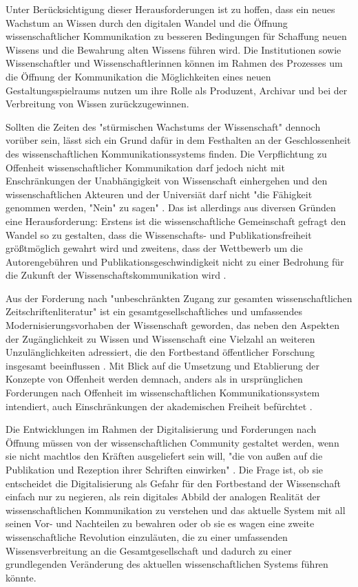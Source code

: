 Unter Berücksichtigung dieser Herausforderungen ist zu hoffen, dass ein neues Wachstum an Wissen durch den digitalen Wandel und die Öffnung wissenschaftlicher Kommunikation zu besseren Bedingungen für Schaffung neuen Wissens und die Bewahrung alten Wissens führen wird. Die Institutionen sowie Wissenschaftler und Wissenschaftlerinnen können im Rahmen des Prozesses um die Öffnung der Kommunikation die Möglichkeiten eines neuen Gestaltungsspielraums nutzen um ihre Rolle als Produzent, Archivar und bei der Verbreitung von Wissen zurückzugewinnen.

Sollten die Zeiten des "stürmischen Wachstums der Wissenschaft" \cite{K_lbel_2002} dennoch vorüber sein, lässt sich ein Grund dafür in dem Festhalten an der Geschlossenheit des wissenschaftlichen Kommunikationssystems finden. Die Verpflichtung zu Offenheit wissenschaftlicher Kommunikation darf jedoch nicht mit Enschränkungen der Unabhängigkeit von Wissenschaft einhergehen und den wissenschaftlichen Akteuren und der Universiät darf nicht "die Fähigkeit genommen werden, "Nein" zu sagen" \cite{suchen_Hornbostel_2006}. Das ist allerdings aus diversen Gründen eine Herausforderung: Erstens ist die wissenschaftliche Gemeinschaft gefragt den Wandel so zu gestalten, dass die Wissenschafts- und Publikationsfreiheit größtmöglich gewahrt wird und zweitens, dass der Wettbewerb um die Autorengebühren und Publikationsgeschwindigkeit nicht zu einer Bedrohung für die Zukunft der Wissenschaftskommunikation wird \cite{Beall_2012} \cite{Lossau_oa_2007}.

Aus der Forderung nach "unbeschränkten Zugang zur gesamten wissenschaftlichen Zeitschriftenliteratur" \cite{boai_2012} ist ein gesamtgesellschaftliches und umfassendes Modernisierungsvorhaben der Wissenschaft geworden, das neben den Aspekten der Zugänglichkeit zu Wissen und Wissenschaft eine Vielzahl an weiteren Unzulänglichkeiten adressiert, die den Fortbestand öffentlicher Forschung insgesamt beeinflussen \cite{brembs2015open}. Mit Blick auf die Umsetzung und Etablierung der Konzepte von Offenheit werden demnach, anders als in ursprünglichen Forderungen nach Offenheit im wissenschaftlichen Kommunikationssystem intendiert, auch Einschränkungen der akademischen Freiheit befürchtet \cite{hagner_2015_sache_buches}.

Die Entwicklungen im Rahmen der Digitalisierung und Forderungen nach Öffnung müssen von der wissenschaftlichen Community gestaltet werden, wenn sie nicht machtlos den Kräften ausgeliefert sein will, "die von außen auf die Publikation und Rezeption ihrer Schriften einwirken" \cite{Hirschi_2015_buch_oa}. Die Frage ist, ob sie entscheidet die Digitalisierung als Gefahr für den Fortbestand der Wissenschaft einfach nur zu negieren, als rein digitales Abbild der analogen Realität der wissenschaftlichen Kommunikation zu verstehen und das aktuelle System mit all seinen Vor- und Nachteilen zu bewahren oder ob sie es wagen eine zweite wissenschaftliche Revolution einzuläuten, die zu einer umfassenden Wissensverbreitung an die Gesamtgesellschaft und dadurch zu einer grundlegenden Veränderung des aktuellen wissenschaftlichen Systems führen könnte.

